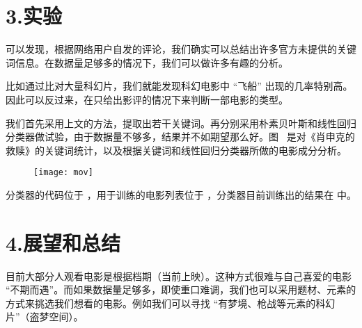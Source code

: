 \documentclass[10pt]{article}
\begin{document}
\section{3.\hspace*{0.5em}实验}\label{section}%

\noindent{}可以发现，根据网络用户自发的评论，我们确实可以总结出许多官方未提供的关键词信息。在数据量足够多的情况下，我们可以做许多有趣的分析。%

比如通过比对大量科幻片，我们就能发现科幻电影中 \textquotedblleft{}飞船\textquotedblright{} 出现的几率特别高。因此可以反过来，在只给出影评的情况下来判断一部电影的类型。%

我们首先采用上文的方法，提取出若干关键词。再分别采用朴素贝叶斯和线性回归分类器做试验，由于数据量不够多，结果并不如期望那么好。图~ 是对《肖申克的救赎》的关键词统计，以及根据关键词和线性回归分类器所做的电影成分分析。%

\begin{figure}[tbp]%
\begin{mdcenter}%

\noindent{}\texttt{[image: mov]}{}%

\mdhr{}%

\noindent{}%
\end{mdcenter}\label{fig-mov}%
\end{figure}%

\noindent{}分类器的代码位于 ，用于训练的电影列表位于 ，分类器目前训练出的结果在  中。%

\section{4.\hspace*{0.5em}展望和总结}\label{section}%

\noindent{}目前大部分人观看电影是根据档期（当前上映）。这种方式很难与自己喜爱的电影 \textquotedblleft{}不期而遇\textquotedblright{}。而如果数据量足够多，即使重口难调，我们也可以采用题材、元素的方式来挑选我们想看的电影。例如我们可以寻找 \textquotedblleft{}有梦境、枪战等元素的科幻片\textquotedblright{}（盗梦空间）。%
\end{document}
